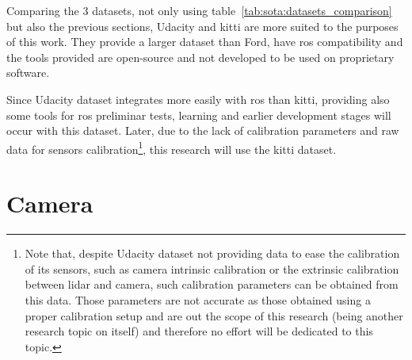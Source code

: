 Comparing the 3 datasets, not only using table~\ref{tab:sota:datasets_comparison} but also the previous sections, Udacity and \ac{kitti} are more suited to the purposes of this work. They provide a larger dataset than Ford, have \ac{ros} compatibility and the tools provided are open-source and not developed to be used on proprietary software.

Since Udacity dataset integrates more easily with \ac{ros} than \ac{kitti}, providing also some tools for \ac{ros} preliminar tests, learning and earlier development stages will occur with this dataset. Later, due to the lack of calibration parameters and raw data for sensors calibration\footnote{Note that, despite Udacity dataset not providing data to ease the calibration of its sensors, such as camera intrinsic calibration or the extrinsic calibration between \ac{lidar} and camera, such calibration parameters can be obtained from this data. Those parameters are not accurate as those obtained using a proper calibration setup and are out the scope of this research (being another research topic on itself) and therefore no effort will be dedicated to this topic.}, this research will use the \ac{kitti} dataset.

\section{Camera}

	
